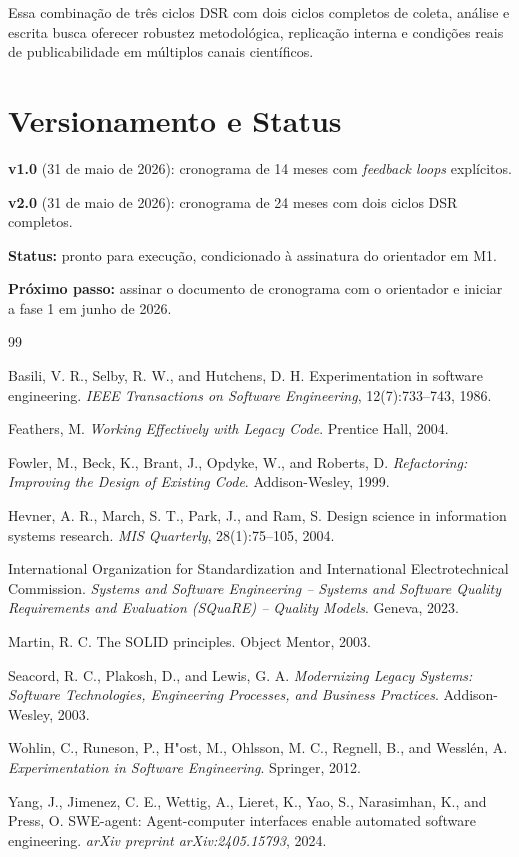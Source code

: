 \documentclass[12pt,a4paper]{article}
\begin{document}
Essa combinação de três ciclos DSR com dois ciclos completos de coleta, análise e escrita busca oferecer robustez metodológica, replicação interna e condições reais de publicabilidade em múltiplos canais científicos.

\section*{Versionamento e Status}

\noindent\textbf{v1.0} (31 de maio de 2026): cronograma de 14 meses com \textit{feedback loops} explícitos.

\noindent\textbf{v2.0} (31 de maio de 2026): cronograma de 24 meses com dois ciclos DSR completos.

\noindent\textbf{Status:} pronto para execução, condicionado à assinatura do orientador em M1.

\noindent\textbf{Próximo passo:} assinar o documento de cronograma com o orientador e iniciar a fase 1 em junho de 2026.

\begin{thebibliography}{99}

Basili, V. R., Selby, R. W., and Hutchens, D. H.
Experimentation in software engineering.
\textit{IEEE Transactions on Software Engineering}, 12(7):733--743, 1986.

Feathers, M.
\textit{Working Effectively with Legacy Code}.
Prentice Hall, 2004.

Fowler, M., Beck, K., Brant, J., Opdyke, W., and Roberts, D.
\textit{Refactoring: Improving the Design of Existing Code}.
Addison-Wesley, 1999.

Hevner, A. R., March, S. T., Park, J., and Ram, S.
Design science in information systems research.
\textit{MIS Quarterly}, 28(1):75--105, 2004.

International Organization for Standardization and International Electrotechnical Commission.
\textit{Systems and Software Engineering -- Systems and Software Quality Requirements and Evaluation (SQuaRE) -- Quality Models}.
Geneva, 2023.

Martin, R. C.
The SOLID principles.
Object Mentor, 2003.

Seacord, R. C., Plakosh, D., and Lewis, G. A.
\textit{Modernizing Legacy Systems: Software Technologies, Engineering Processes, and Business Practices}.
Addison-Wesley, 2003.

Wohlin, C., Runeson, P., H{"o}st, M., Ohlsson, M. C., Regnell, B., and Wessl{\'e}n, A.
\textit{Experimentation in Software Engineering}.
Springer, 2012.

Yang, J., Jimenez, C. E., Wettig, A., Lieret, K., Yao, S., Narasimhan, K., and Press, O.
SWE-agent: Agent-computer interfaces enable automated software engineering.
\textit{arXiv preprint arXiv:2405.15793}, 2024.

\end{thebibliography}
\end{document}
